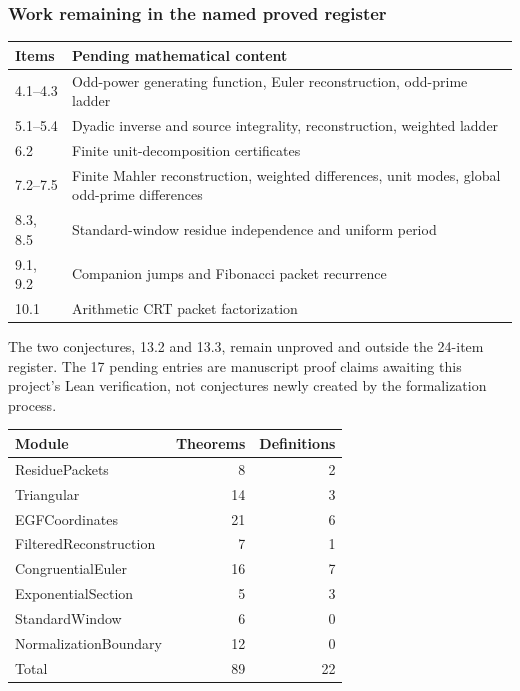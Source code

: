\subsubsection*{Work remaining in the named proved register}
\begin{center}\small
\begin{tabular}{@{}p{}p{}@{}}
\toprule
Items & Pending mathematical content\\\midrule
4.1--4.3 & Odd-power generating function, Euler reconstruction, odd-prime ladder\\
5.1--5.4 & Dyadic inverse and source integrality, reconstruction, weighted ladder\\
6.2 & Finite unit-decomposition certificates\\
7.2--7.5 & Finite Mahler reconstruction, weighted differences, unit modes, global odd-prime differences\\
8.3, 8.5 & Standard-window residue independence and uniform period\\
9.1, 9.2 & Companion jumps and Fibonacci packet recurrence\\
10.1 & Arithmetic CRT packet factorization\\\bottomrule
\end{tabular}\end{center}
The two conjectures, 13.2 and 13.3, remain unproved and outside the 24-item register. The 17 pending entries are manuscript proof claims awaiting this project's Lean verification, not conjectures newly created by the formalization process.
\par\medskip
{}
\begin{center}\small
\begin{tabular}{@{}lrr@{}}\toprule
Module & Theorems & Definitions\\\midrule
ResiduePackets & 8 & 2\\
Triangular & 14 & 3\\
EGFCoordinates & 21 & 6\\
FilteredReconstruction & 7 & 1\\
CongruentialEuler & 16 & 7\\
ExponentialSection & 5 & 3\\
StandardWindow & 6 & 0\\
NormalizationBoundary & 12 & 0\\\midrule
Total & 89 & 22\\\bottomrule
\end{tabular}\end{center}

